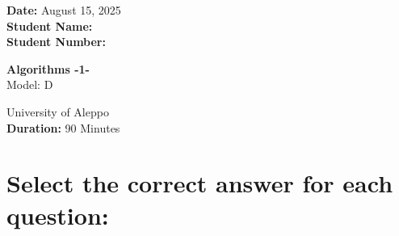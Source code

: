 \documentclass[12pt]{article}
\begin{document}
\begin{minipage}[t]{0.3\textwidth}
    \textbf{Date:} August 15, 2025\\[0.5em]
    \textbf{Student Name: }\\[0.5em]
    \textbf{Student Number: }
\end{minipage}
\begin{minipage}[t]{0.3\textwidth}
    \centering
    \Large\textbf{Algorithms -1-}\\[0.5em]
    \Large{Model:} D\\[0.5em]
\end{minipage}\hfill
\begin{minipage}[t]{0.3\textwidth}
    \raggedleft
    University of Aleppo\\[0.5em]
    \textbf{Duration: }90 Minutes

\end{minipage}

\vspace{1.5cm}

\section*{\small Select the correct answer for each question:}
\end{document}
